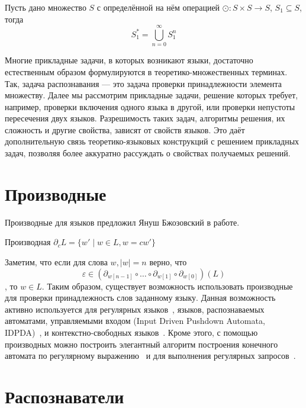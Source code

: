\begin{definition}
  Пусть дано множество $S$ с определённой на нём операцией $\odot: S \times S \to S$, $S_1 \subseteq S$, тогда
  $$
    S_1 ^ * = \bigcup_{n = 0}^{\infty} S_1^n
  $$
\end{definition}

Многие прикладные задачи, в которых возникают языки, достаточно естественным образом формулируются в теоретико-множественных терминах.
Так, задача распознавания --- это задача проверки принадлежности элемента множеству.
Далее мы рассмотрим прикладные задачи, решение которых требует, например, проверки включения одного языка в другой, или проверки непустоты пересечения двух языков.
Разрешимость таких задач, алгоритмы решения, их сложность и другие свойства, зависят от свойств языков.
Это даёт дополнительную связь теоретико-языковых конструкций с решением прикладных задач, позволяя более аккуратно рассуждать о свойствах получаемых решений.

\section{Производные}

Производные для языков предложил Януш Бжозовский в работе.

\begin{definition}
  Производная $\partial_c L = \{ w' \mid w \in L, w = cw'\}$
\end{definition}

Заметим, что если для слова $w, |w|=n$ верно, что $$\varepsilon \in (\partial_{w[n-1]} \circ \ldots \circ \partial_{w[1]}  \circ \partial_{w[0]}) (L)$$, то $w \in L$.
Таким образом, существует возможность использовать производные для проверки принадлежность слов заданному языку.
Данная возможность активно используется для регулярных языков~, языков, распознаваемых автоматами, управляемыми входом (Input Driven Pushdown Automata, IDPDA)~, и контекстно-свободных языков~.
Кроме этого, с помощью производных можно построить элегантный алгоритм построения конечного автомата по регулярному выражению~ и для выполнения регулярных запросов~.


\section{Распознаватели}

